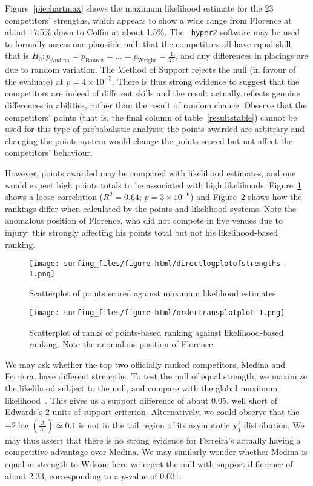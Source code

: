 \documentclass{article}
\begin{document}
Figure~\ref{piechartmax} shows the maximum likelihood estimate for the
23 competitors' strengths, which appears to show a wide range from
Florence at about 17.5\% down to Coffin at about 1.5\%.  The {\tt
  hyper2} software may be used to formally assess one plausible null:
that the competitors all have equal skill, that is $H_0\colon
p_\mathrm{Andino} = p_\mathrm{Bourez}=\ldots=
p_\mathrm{Wright}=\frac{1}{23}$, and any differences in placings are
due to random variation.  The Method of Support \cite{edwards1992}
rejects the null (in favour of the evaluate) at $p=4\times 10^{-5}$.
There is thus strong evidence to suggest that the competitors are
indeed of different skills and the result actually reflects genuine
differences in abilities, rather than the result of random chance.
Observe that the competitors' points (that is, the final column of
table~\ref{resultstable}) cannot be used for this type of
probabalistic analysis: the points awarded are arbitrary and changing
the points system would change the points scored but not affect the
competitors' behaviour.

However, points awarded may be compared with likelihood estimates, and
one would expect high points totals to be associated with high
likelihoods.  Figure~\ref{compare_likelihood_points} shows a loose
correlation ($R^2=0.64$; $p=3\times 10^{-6}$) and
Figure~\ref{compare_likelihood_points_rankings} shows how the rankings
differ when calculated by the points and likelihood systems.  Note the
anomalous position of Florence, who did not compete in five venues due
to injury: this strongly affecting his points total but not his
likelihood-based ranking.

\begin{figure}[h]
\texttt{[image: surfing\_files/figure-html/directlogplotofstrengths-1.png]}
\caption{Scatterplot of points scored  \label{compare_likelihood_points} 
against maximum likelihood estimates}
\end{figure}

\begin{figure}[h]
\texttt{[image: surfing\_files/figure-html/ordertransplotplot-1.png]}
\caption{Scatterplot of ranks \label{compare_likelihood_points_rankings} of points-based ranking
against likelihood-based ranking.  Note the anomalous position of
Florence}
\end{figure}

We may ask whether the top two officially ranked competitors, Medina
and Ferreira, have different strengths.  To test the null of equal
strength, we maximize the likelihood subject to the null, and compare
with the global maximum likelihood~\cite{hankin2010}.  This gives us a
support difference of about 0.05, well short of Edwards's 2 units of
support criterion.  Alternatively, we could observe that the
$-2\log\left(\frac{\Lambda}{\Lambda_0}\right)\simeq 0.1$ is not in the
tail region of its asymptotic $\chi^2_1$ distribution.  We may thus
assert that there is no strong evidence for Ferreira's actually having
a competitive advantage over Medina.  We may similarly wonder whether
Medina is equal in strength to Wilson; here we reject the null with
support difference of about 2.33, corresponding to a $p$-value of
$0.031$.
\end{document}
